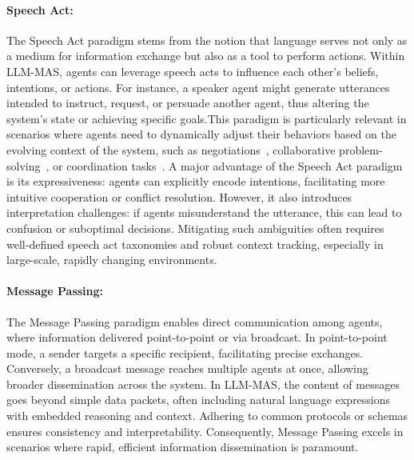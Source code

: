 \paragraph{Speech Act:}The Speech Act paradigm stems from the notion that language serves not only as a medium for information exchange but also as a tool to perform actions. Within LLM-MAS, agents can leverage speech acts to influence each other's beliefs, intentions, or actions. For instance, a speaker agent might generate utterances intended to instruct, request, or persuade another agent, thus altering the system's state or achieving specific goals.This paradigm is particularly relevant in scenarios where agents need to dynamically adjust their behaviors based on the evolving context of the system, such as negotiations~\cite{polca_mas_for_political,richeliey_diplomacy_society}, collaborative problem-solving~\cite{debate_improve_llm_1}, or coordination tasks~\cite{chatdev_software_development}. A major advantage of the Speech Act paradigm is its expressiveness: agents can explicitly encode intentions, facilitating more intuitive cooperation or conflict resolution. However, it also introduces interpretation challenges: if agents misunderstand the utterance, this can lead to confusion or suboptimal decisions. Mitigating such ambiguities often requires well-defined speech act taxonomies and robust context tracking, especially in large-scale, rapidly changing environments.


\paragraph{Message Passing:}The Message Passing paradigm enables direct communication among agents, where information delivered point-to-point or via broadcast. In point-to-point mode, a sender targets a specific recipient, facilitating precise exchanges. Conversely, a broadcast message reaches multiple agents at once, allowing broader dissemination across the system. In LLM-MAS, the content of messages goes beyond simple data packets, often including natural language expressions with embedded reasoning and context. Adhering to common protocols or schemas ensures consistency and interpretability. Consequently, Message Passing excels in scenarios where rapid, efficient information dissemination is paramount.

